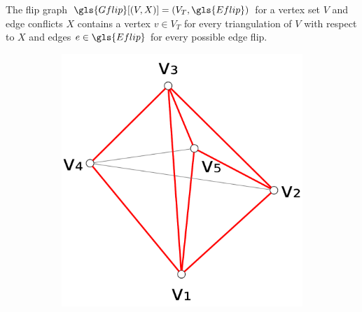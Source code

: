 
\begin{definition}
  \label{def:flip_graph}
  The flip graph \(\gls{Gflip}[(V,X)] = (V_T,\gls{Eflip})\) for a
  vertex set \(V\) and edge conflicts \(X\) contains a vertex
  \(v \in V_T\) for every triangulation of \(V\) with respect to
  \(X\) and edges \(e \in \gls{Eflip}\) for every possible edge flip.
\end{definition}


\begin{figure}[ht]
  \centering
  \begin{subfigure}{0.3\textwidth}
    \centering
    \includegraphics[width=\textwidth]{img/example_triangulation_1.pdf}
    \caption{}
  \end{subfigure}
  \hspace{0em}
  \VRule
  \hspace{0em}
  \begin{subfigure}{0.3\textwidth}
    \centering

\end{subfigure}
\end{figure}
